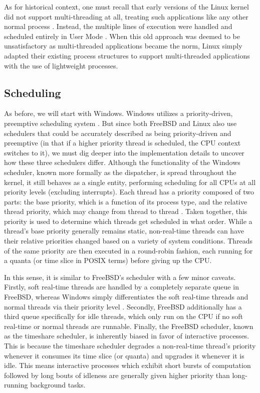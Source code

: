 \documentclass[onecolumn, draftclsnofoot,10pt, compsoc]{IEEEtran}
\begin{document}
As for historical context, one must recall that early versions of the Linux kernel did not support multi-threading at all, treating such applications like any other normal process \cite{LinuxKernel}. Instead, the multiple lines of execution were handled and scheduled entirely in User Mode \cite{LinuxKernel}. When this old approach was deemed to be unsatisfactory as multi-threaded applications became the norm, Linux simply adapted their existing process structures to support multi-threaded applications with the use of lightweight processes.
\subsection{Scheduling}
As before, we will start with Windows. Windows utilizes a priority-driven, preemptive scheduling system \cite{WindowsInternals}. But since both FreeBSD and Linux also use schedulers that could be accurately described as being priority-driven and preemptive (in that if a higher priority thread is scheduled, the CPU context switches to it), we must dig deeper into the implementation details to uncover how these three schedulers differ. Although the functionality of the Windows scheduler, known more formally as the dispatcher, is spread throughout the kernel, it still behaves as a single entity, performing scheduling for all CPUs at all priority levels (excluding interrupts). Each thread has a priority composed of two parts: the base priority, which is a function of its process type, and the relative thread priority, which may change from thread to thread \cite{WindowsInternals}. Taken together, this priority is used to determine which threads get scheduled in what order. While a thread's base priority generally remains static, non-real-time threads can have their relative priorities changed based on a variety of system conditions. Threads of the same priority are then executed in a round-robin fashion, each running for a quanta (or time slice in POSIX terms) before giving up the CPU. 

In this sense, it is similar to FreeBSD's scheduler with a few minor caveats. Firstly, soft real-time threads are handled by a completely separate queue in FreeBSD, whereas Windows simply differentiates the soft real-time threads and normal threads via their priority level \cite{FreeBSD}. Secondly, FreeBSD additionally has a third queue specifically for idle threads, which only run on the CPU if no soft real-time or normal threads are runnable. Finally, the FreeBSD scheduler, known as the timeshare scheduler, is inherently biased in favor of interactive processes. This is because the timeshare scheduler degrades a non-real-time thread's priority whenever it consumes its time slice (or quanta) and upgrades it whenever it is idle. This means interactive processes which exhibit short bursts of computation followed by long bouts of idleness are generally given higher priority than long-running background tasks.
\end{document}
